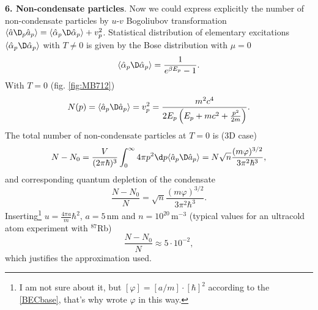 
\textbf{6. Non-condensate particles}.  Now we could express explicitly the number of non-condensate particles by $u$-$v$ Bogoliubov transformation $\langle \hat{a}\D_p \hat{a}_p \rangle = \langle \hat{\alpha}_p\D \hat{\alpha}_p\rangle + v_p^2$. Statistical distribution of elementary excitations $\langle \hat{\alpha}_p\D \hat{\alpha}_p\rangle$ with $T \neq 0$ is given by the Bose distribution with $\mu=0$
\begin{equation*}
	\langle \hat{\alpha}_p\D \hat{\alpha}_p\rangle = \frac{1}{e^{\beta E_p}-1}.
\end{equation*}
With $T=0$ (fig. \ref{fig:MB712})
\begin{equation*}
	N(p) =  \langle \hat{a}_p\D \hat{a}_p \rangle = v_p^2 =  \frac{ m^2 c^4}{2 E_p \left(
		E_p + m c^2 + \frac{p^2}{2m}
	\right)}.
\end{equation*}
The total number of non-condensate particles at $T=0$ is (3D case)
\begin{equation*}
	N- N_0 = \frac{V}{(2\pi \hbar)^3} \int_{0}^{\infty}  4 \pi p^2 \d p  \langle \hat{a}_p\D \hat{a}_p \rangle = N \sqrt{n} \frac{(m \varphi)^{3/2}}{3 \pi^2 \hbar^3},
\end{equation*}
and  corresponding quantum depletion of the condensate
\begin{equation*}
	\frac{N-N_0}{N} = \sqrt{n} \frac{(m \varphi)^{3/2}}{3 \pi^2 \hbar^3}.
\end{equation*}
Inserting\footnote{
	I am not sure about it, but $[\varphi]= [a/m] \cdot [\hbar]^2$ according to the \eqref{BECbase}, that's why wrote $\varphi$ in this way.
} $u=\frac{4\pi a}{m} \hbar^2$, $a=5\,$nm and $n = 10^{20}\,$m${}^{-3}$ (typical values for an ultracold atom experiment with ${}^{87}$Rb) 
\begin{equation*}
	\frac{N-N_0}{N} \approx 5 \cdot 10^{-2},
\end{equation*}
which justifies the approximation used.

